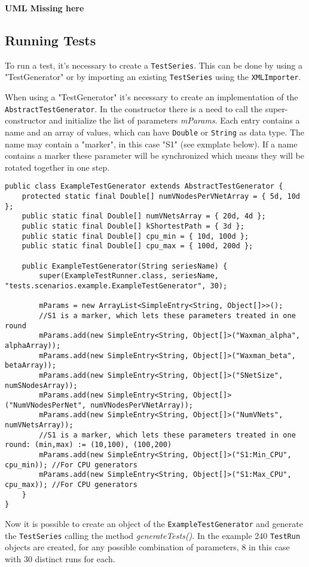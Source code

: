 \textbf{UML Missing here}




\subsection{Running Tests}
To run a test, it's necessary to create a \texttt{TestSeries}. 
This can be done by using a "TestGenerator" or by importing an existing \texttt{TestSeries} using the \texttt{XMLImporter}.

When using a "TestGenerator" it's necessary to create an implementation of the \texttt{Abstract\-Test\-Generator}.
In the constructor there is a need to call the super-constructor and initialize the list of parameters \textsl{mParams}.
Each entry contains a name and an array of values, which can have \texttt{Double} or \texttt{String} as data type.
The name may contain a "marker", in this case "S1" (see exmplate below). 
If a name contains a marker these parameter will be synchronized which means they will be rotated together in one step.

\begin{lstlisting}
public class ExampleTestGenerator extends AbstractTestGenerator {
	protected static final Double[] numVNodesPerVNetArray = { 5d, 10d };
	public static final Double[] numVNetsArray = { 20d, 4d };
	public static final Double[] kShortestPath = { 3d };
	public static final Double[] cpu_min = { 10d, 100d };
	public static final Double[] cpu_max = { 100d, 200d };
	
	public ExampleTestGenerator(String seriesName) {
		super(ExampleTestRunner.class, seriesName, "tests.scenarios.example.ExampleTestGenerator", 30);
		
		mParams = new ArrayList<SimpleEntry<String, Object[]>>();
		//S1 is a marker, which lets these parameters treated in one round
		mParams.add(new SimpleEntry<String, Object[]>("Waxman_alpha", alphaArray));
		mParams.add(new SimpleEntry<String, Object[]>("Waxman_beta", betaArray));
		mParams.add(new SimpleEntry<String, Object[]>("SNetSize", numSNodesArray));
		mParams.add(new SimpleEntry<String, Object[]>("NumVNodesPerNet", numVNodesPerVNetArray));
		mParams.add(new SimpleEntry<String, Object[]>("NumVNets", numVNetsArray));
		//S1 is a marker, which lets these parameters treated in one round: (min,max) := (10,100), (100,200)
		mParams.add(new SimpleEntry<String, Object[]>("S1:Min_CPU", cpu_min)); //For CPU generators
		mParams.add(new SimpleEntry<String, Object[]>("S1:Max_CPU", cpu_max)); //For CPU generators
	}
}
\end{lstlisting}
Now it is possible to create an object of the \texttt{ExampleTestGenerator} and generate the \texttt{TestSeries} calling the method
\textsl{generateTests()}.
In the example 240 \texttt{TestRun} objects are created, for any possible combination of parameters, 8 in this case with 30 distinct runs for each.

